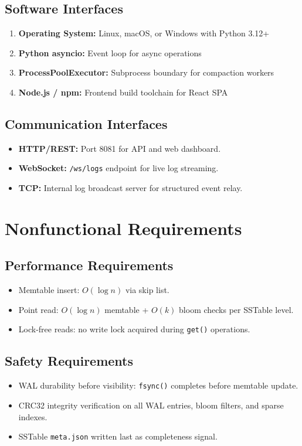 \documentclass[oneside,a4paper,12pt]{book}
\begin{document}
\subsection{Software Interfaces}
\begin{enumerate}[leftmargin=2em]
    \item \textbf{Operating System:} Linux, macOS, or Windows with Python 3.12+
    \item \textbf{Python asyncio:} Event loop for async operations
    \item \textbf{ProcessPoolExecutor:} Subprocess boundary for compaction workers
    \item \textbf{Node.js / npm:} Frontend build toolchain for React SPA
\end{enumerate}

\subsection{Communication Interfaces}
\begin{itemize}[leftmargin=2em]
    \item \textbf{HTTP/REST:} Port 8081 for API and web dashboard.
    \item \textbf{WebSocket:} \texttt{/ws/logs} endpoint for live log streaming.
    \item \textbf{TCP:} Internal log broadcast server for structured event relay.
\end{itemize}

\section{Nonfunctional Requirements}

\subsection{Performance Requirements}
\begin{itemize}[leftmargin=2em]
    \item Memtable insert: $O(\log n)$ via skip list.
    \item Point read: $O(\log n)$ memtable + $O(k)$ bloom checks per SSTable level.
    \item Lock-free reads: no write lock acquired during \texttt{get()} operations.
\end{itemize}

\subsection{Safety Requirements}
\begin{itemize}[leftmargin=2em]
    \item WAL durability before visibility: \texttt{fsync()} completes before memtable update.
    \item CRC32 integrity verification on all WAL entries, bloom filters, and sparse indexes.
    \item SSTable \texttt{meta.json} written last as completeness signal.
\end{itemize}
\end{document}
